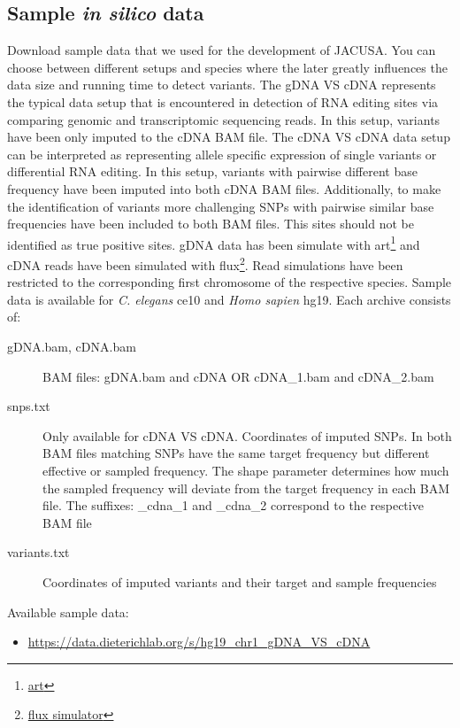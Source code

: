 \documentclass[10pt, a4paper]{article}
\begin{document}
\subsection{Sample \textit{in silico} data}
Download sample data that we used for the development of JACUSA. You can choose between different
setups and species where the later greatly influences the data size and running time to detect
variants. The gDNA VS cDNA represents the typical data setup that is encountered in detection of RNA
editing sites via comparing genomic and transcriptomic sequencing reads. In this setup, variants
have been only imputed to the cDNA BAM file. The cDNA VS cDNA data setup can be interpreted as
representing allele specific expression of single variants or differential RNA editing. In this
setup, variants with pairwise different base frequency have been imputed into both cDNA BAM files.
Additionally, to make the identification of variants more challenging SNPs with pairwise similar base
frequencies have been included to both BAM files. This sites should not be identified as true
positive sites.
gDNA data has been simulate with
art\footnote{\href{http://www.niehs.nih.gov/research/resources/software/biostatistics/art/}{art}}
and cDNA reads have been simulated with
flux\footnote{\href{http://sammeth.net/confluence/display/SIM/Home}{flux simulator}}. Read
simulations have been restricted to the corresponding first chromosome of the respective species.
Sample data is available for \textit{C. elegans} ce10 and \textit{Homo sapien} hg19. Each archive
consists of:
\begin{description}
  \item[gDNA.bam, cDNA.bam] BAM files: gDNA.bam and cDNA OR cDNA\_1.bam and cDNA\_2.bam
  \item[snps.txt] Only available for cDNA VS cDNA. Coordinates of imputed SNPs. In both
  BAM files matching SNPs have the same target frequency but different effective or sampled
  frequency. The shape parameter determines how much the sampled frequency will deviate from the
  target frequency in each BAM file. The suffixes: \_cdna\_1 and \_cdna\_2 correspond to the
  respective BAM file
  \item[variants.txt] Coordinates of imputed variants and their target and sample
  frequencies
\end{description}
Available sample data:
\begin{itemize}
  \item \url{https://data.dieterichlab.org/s/hg19_chr1_gDNA_VS_cDNA}
\end{itemize}
\end{document}
